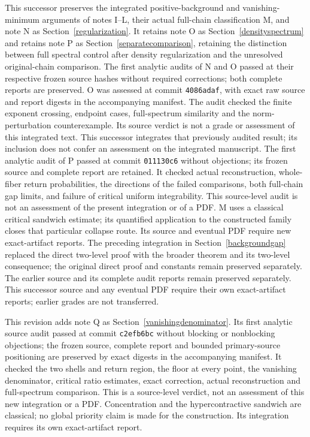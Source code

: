 \documentclass[11pt]{article}
\begin{document}
This successor preserves the integrated positive-background and vanishing-minimum arguments of notes I--L, their actual full-chain classification M, and note N as Section~\ref{regularization}. It retains note O as Section~\ref{densityspectrum} and retains note P as Section~\ref{separatecomparison}, retaining the distinction between full spectral control after density regularization and the unresolved original-chain comparison. The first analytic audits of N and O passed at their respective frozen source hashes without required corrections; both complete reports are preserved. O was assessed at commit \texttt{4086adaf}, with exact raw source and report digests in the accompanying manifest. The audit checked the finite exponent crossing, endpoint cases, full-spectrum similarity and the norm-perturbation counterexample. Its source verdict is not a grade or assessment of this integrated text. This successor integrates that previously audited result; its inclusion does not confer an assessment on the integrated manuscript. The first analytic audit of P passed at commit \texttt{011130c6} without objections; its frozen source and complete report are retained. It checked actual reconstruction, whole-fiber return probabilities, the directions of the failed comparisons, both full-chain gap limits, and failure of critical uniform integrability. This source-level audit is not an assessment of the present integration or of a PDF. M uses a classical critical sandwich estimate; its quantified application to the constructed family closes that particular collapse route. Its source and eventual PDF require new exact-artifact reports. The preceding integration in Section~\ref{backgroundgap} replaced the direct two-level proof with the broader theorem and its two-level consequence; the original direct proof and constants remain preserved separately. The earlier source and its complete audit reports remain preserved separately. This successor source and any eventual PDF require their own exact-artifact reports; earlier grades are not transferred.

This revision adds note Q as Section~\ref{vanishingdenominator}. Its first analytic source audit passed at commit \texttt{c2efb6bc} without blocking or nonblocking objections; the frozen source, complete report and bounded primary-source positioning are preserved by exact digests in the accompanying manifest. It checked the two shells and return region, the floor at every point, the vanishing denominator, critical ratio estimates, exact correction, actual reconstruction and full-spectrum comparison. This is a source-level verdict, not an assessment of this new integration or a PDF. Concentration and the hypercontractive sandwich are classical; no global priority claim is made for the construction. Its integration requires its own exact-artifact report.
\end{document}
